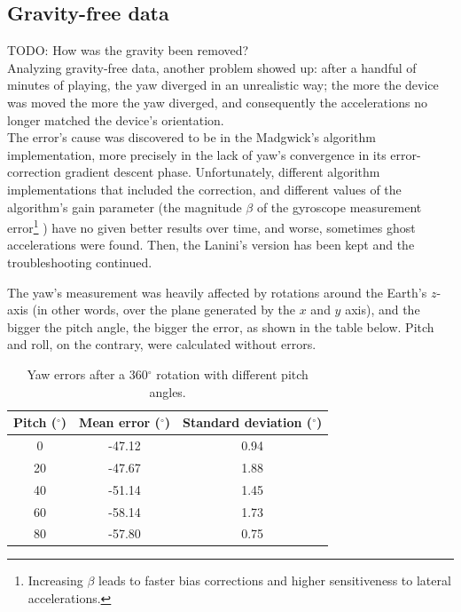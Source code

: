 \subsection{Gravity-free data}
TODO: How was the gravity been removed?\\
Analyzing gravity-free data, another problem showed up: after a handful of minutes of playing, the yaw diverged in an unrealistic way; the more the device was moved the more the yaw diverged, and consequently the accelerations no longer matched the device's orientation.\\
The error's cause was discovered to be in the Madgwick's algorithm implementation, more precisely in the lack of yaw's convergence in its error-correction gradient descent phase. Unfortunately, different algorithm implementations that included the correction, and different values of the algorithm's gain parameter (the magnitude $\beta$ of the gyroscope measurement error\footnote{Increasing $\beta$ leads to faster bias corrections and higher sensitiveness to lateral accelerations.} \cite[13]{Mad10}) have no given better results over time, and worse, sometimes ghost accelerations were found. Then, the Lanini's version has been kept and the troubleshooting continued.
\bigbreak

The yaw's measurement was heavily affected by rotations around the Earth's $z$-axis (in other words, over the plane generated by the $x$ and $y$ axis), and the bigger the pitch angle, the bigger the error, as shown in the table below. Pitch and roll, on the contrary, were calculated without errors.
\bigbreak

\begin{table}[ht!]
	\centering
	\begin{tabular}{c|c c}
	\textbf{Pitch} ($^{\circ}$) & \textbf{Mean error} ($^{\circ}$) & \textbf{Standard deviation} ($^{\circ}$) \\ \hline
	0                           & -47.12                           & 0.94                                     \\
	20                          & -47.67                           & 1.88                                     \\
	40                          & -51.14                           & 1.45                                     \\
	60                          & -58.14                           & 1.73                                     \\
	80                          & -57.80                           & 0.75
	\end{tabular}
	\caption{Yaw errors after a 360$^{\circ}$ rotation with different pitch angles.}
\end{table}

